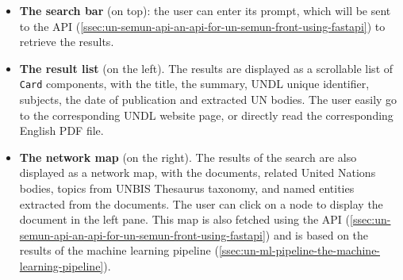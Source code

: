\begin{itemize}
    \item \textbf{The search bar} (on top): the user can enter its prompt, which will be sent to the API (\ref{ssec:un-semun-api-an-api-for-un-semun-front-using-fastapi}) to retrieve the results.

    \item \textbf{The result list} (on the left). The results are displayed as a scrollable list of \texttt{Card} components, with the title, the summary, UNDL unique identifier, subjects, the date of publication and extracted UN bodies. The user easily go to the corresponding UNDL website page, or directly read the corresponding English PDF file.

    \item \textbf{The network map} (on the right). The results of the search are also displayed as a network map, with the documents, related United Nations bodies, topics from UNBIS Thesaurus taxonomy, and named entities extracted from the documents. The user can click on a node to display the document in the left pane. This map is also fetched using the API (\ref{ssec:un-semun-api-an-api-for-un-semun-front-using-fastapi}) and is based on the results of the machine learning pipeline (\ref{ssec:un-ml-pipeline-the-machine-learning-pipeline}).
\end{itemize}

